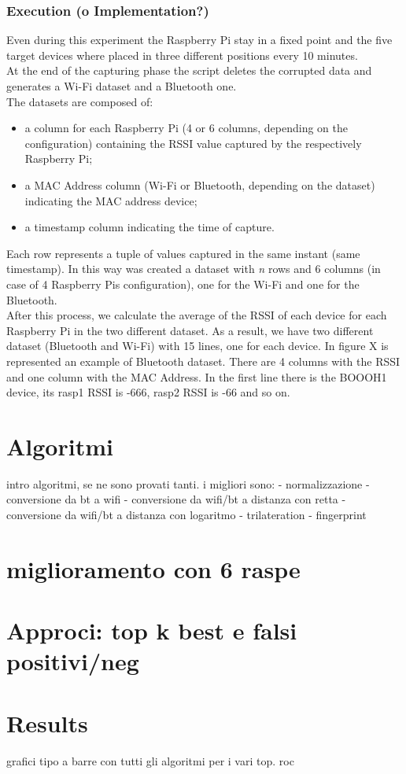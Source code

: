 \subsubsection{Execution (o Implementation?)}
Even during this experiment the Raspberry Pi stay in a fixed point and the five target devices where placed in three different positions every 10 minutes. \\
At the end of the capturing phase the script deletes the corrupted data and generates a Wi-Fi dataset and a Bluetooth one.\\
The datasets are composed of:
\begin{itemize}
\item a column for each Raspberry Pi (4 or 6 columns, depending on the configuration) containing the RSSI value captured by the respectively Raspberry Pi;
\item a MAC Address column (Wi-Fi or Bluetooth, depending on the dataset) indicating the MAC address device;
\item a timestamp column indicating the time of capture.
\end{itemize}
Each row represents a tuple of values captured in the same instant (same timestamp).
In this way was created a dataset with \textit{n} rows and 6 columns (in case of 4 Raspberry Pis configuration), one for the Wi-Fi and one for the Bluetooth.\\
\linebreak
After this process, we calculate the average of the RSSI of each device for each Raspberry Pi in the two different dataset. As a result, we have two different dataset (Bluetooth and Wi-Fi) with 15 lines, one for each device. In figure X is represented an example of Bluetooth dataset. There are 4 columns with the RSSI and one column with the MAC Address. In the first line there is the BOOOH1 device, its rasp1 RSSI is -666, rasp2 RSSI is -66 and so on.

\section{Algoritmi}
intro algoritmi, se ne sono provati tanti. i migliori sono: 
- normalizzazione
- conversione da bt a wifi
- conversione da wifi/bt a distanza con retta
- conversione da wifi/bt a distanza con logaritmo
- trilateration
- fingerprint

\section{miglioramento con 6 raspe}

\section{Approci: top k best e falsi positivi/neg	}


\section{Results}
grafici tipo a barre con tutti gli algoritmi per i vari top.
roc